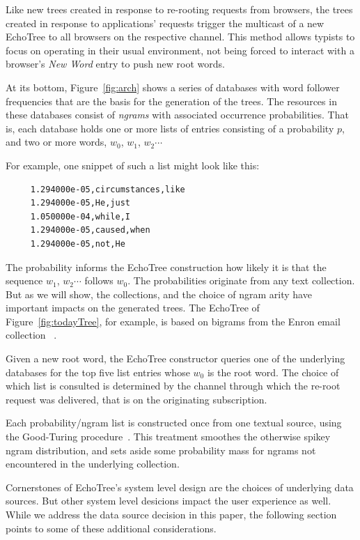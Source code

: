 \documentclass{sigchi}
\begin{document}
Like new trees created in response to re-rooting requests from
browsers, the trees created in response to applications' requests
trigger the multicast of a new EchoTree to all browsers on the
respective channel. This method allows typists to focus on operating
in their usual environment, not being forced to interact with a
browser's {\em New Word} entry to push new root words.

At its bottom, Figure~\ref{fig:arch} shows a series of databases with
word follower frequencies that are the basis for the generation of the
trees. The resources in these databases consist of {\em ngrams} with
associated occurrence probabilities. That is, each database holds one
or more lists of entries consisting of a probability $p$, and two or
more words, $w_0$, $w_1$, $w_2\cdots$

For example, one snippet of such a list might look like this:

\begin{verbatim}
     1.294000e-05,circumstances,like
     1.294000e-05,He,just
     1.050000e-04,while,I
     1.294000e-05,caused,when
     1.294000e-05,not,He
\end{verbatim}

The probability informs the EchoTree construction how likely it is
that the sequence $w_1$, $w_2\cdots$ follows $w_0$. The probabilities
originate from any text collection. But as we will show, the
collections, and the choice of ngram arity have important impacts on
the generated trees. The EchoTree of Figure~\ref{fig:todayTree}, for
example, is based on bigrams from the Enron email collection
~\cite{enron}.

Given a new root word, the EchoTree constructor queries one of the
underlying databases for the top five list entries whose $w_0$ is the
root word. The choice of which list is consulted is determined by the
channel through which the re-root request was delivered, that is on
the originating subscription.

Each probability/ngram list is constructed once from one textual
source, using the Good-Turing
procedure~\cite{Gale95good-turingsmoothing}. This treatment smoothes the
otherwise spikey ngram distribution, and sets aside some probability
mass for ngrams not encountered in the underlying collection.

Cornerstones of EchoTree's system level design are the choices of
underlying data sources. But other system level desicions impact the
user experience as well. While we address the data source decision in
this paper, the following section points to some of these additional
considerations.
\end{document}

